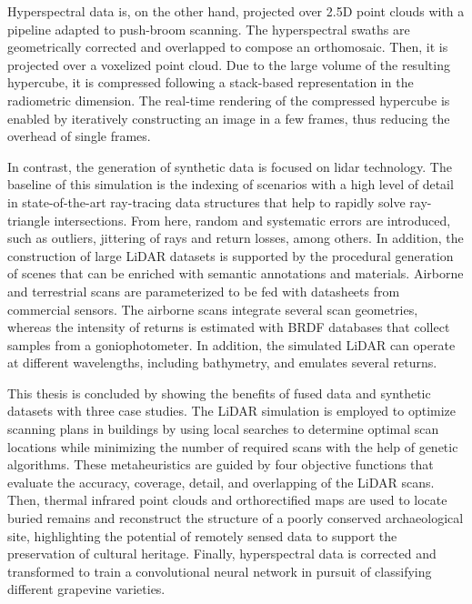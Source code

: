 
Hyperspectral data is, on the other hand, projected over 2.5D point clouds with a pipeline adapted to push-broom scanning. The hyperspectral swaths are geometrically corrected and overlapped to compose an orthomosaic. Then, it is projected over a voxelized point cloud. Due to the large volume of the resulting hypercube, it is compressed following a stack-based representation in the radiometric dimension. The real-time rendering of the compressed hypercube is enabled by iteratively constructing an image in a few frames, thus reducing the overhead of single frames. 

In contrast, the generation of synthetic data is focused on \acrshort{lidar} technology. The baseline of this simulation is the indexing of scenarios with a high level of detail in state-of-the-art ray-tracing data structures that help to rapidly solve ray-triangle intersections. From here, random and systematic errors are introduced, such as outliers, jittering of rays and return losses, among others. In addition, the construction of large LiDAR datasets is supported by the procedural generation of scenes that can be enriched with semantic annotations and materials. Airborne and terrestrial scans are parameterized to be fed with datasheets from commercial sensors. The airborne scans integrate several scan geometries, whereas the intensity of returns is estimated with BRDF databases that collect samples from a goniophotometer. In addition, the simulated LiDAR can operate at different wavelengths, including bathymetry, and emulates several returns.

This thesis is concluded by showing the benefits of fused data and synthetic datasets with three case studies. The LiDAR simulation is employed to optimize scanning plans in buildings by using local searches to determine optimal scan locations while minimizing the number of required scans with the help of genetic algorithms. These metaheuristics are guided by four objective functions that evaluate the accuracy, coverage, detail, and overlapping of the LiDAR scans. Then, thermal infrared point clouds and orthorectified maps are used to locate buried remains and reconstruct the structure of a poorly conserved archaeological site, highlighting the potential of remotely sensed data to support the preservation of cultural heritage. Finally, hyperspectral data is corrected and transformed to train a convolutional neural network in pursuit of classifying different grapevine varieties.

